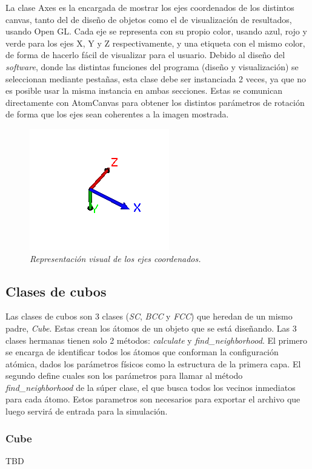La clase Axes es la encargada de mostrar los ejes coordenados de los distintos canvas, tanto del de diseño de objetos como el de visualización de resultados, usando Open GL.
Cada eje se representa con su propio color, usando azul, rojo y verde para los ejes X, Y y Z respectivamente, y una etiqueta con el mismo color, de forma de hacerlo fácil de visualizar para el usuario.
Debido al diseño del \emph{software}, donde las distintas funciones del programa (diseño y visualización) se seleccionan mediante pestañas, esta clase debe ser instanciada 2 veces, ya que no es posible usar la misma instancia en ambas secciones. Estas se comunican directamente con AtomCanvas para obtener los distintos parámetros de rotación de forma que los ejes sean coherentes a la imagen mostrada.

\begin{figure}[ht]
  \centering
  \includegraphics[scale=1]{images/axes}
  \caption{\em Representación visual de los ejes coordenados.}
\end{figure}

\subsection{Clases de cubos}


Las clases de cubos son 3 clases (\emph{SC}, \emph{BCC} y \emph{FCC}) que heredan de un mismo padre, \emph{Cube}. Estas crean los átomos de un objeto que se está diseñando. Las 3 clases hermanas tienen solo 2 métodos: \emph{calculate} y \emph{find\_neighborhood}. El primero se encarga de identificar todos los átomos que conforman la configuración atómica, dados los parámetros físicos como la estructura de la primera capa. El segundo define cuales son los parámetros para llamar al método \emph{find\_neighborhood} de la súper clase, el que busca todos los vecinos inmediatos para cada átomo. Estos parametros son necesarios para exportar el archivo que luego servirá de entrada para la simulación.

\subsubsection{Cube}
TBD


